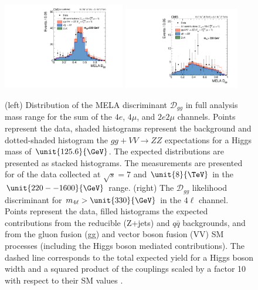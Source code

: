 \begin{figure}
\centering
\includegraphics[width=0.475\textwidth]{HZZ_Width/cCompare_DataMC_AllTeV_Dgg10__Low220.pdf}
\includegraphics[width=0.45\textwidth]{HZZ_Width/fig3b_new.pdf}
\caption[(left) Distribution of the MELA discriminant $\mathcal{D}_{gg}$ in full analysis mass range for the sum of the $4e$, $4\mu$, and $2e2\mu$ channels. Points represent the data, shaded histograms represent the background and dotted-shaded histogram the $gg+VV \to ZZ$ expectations for a Higgs mass of $\unit{125.6}{\GeV}$. The expected distributions are presented as stacked histograms. The measurements are presented for of the data collected at $\sqrt{s} = 7$ and $\unit{8}{\TeV}$ in the $\unit{220--1600}{\GeV}$ range. (right) The $\mathcal{D}_{gg}$ likelihood discriminant for $m_{4\ell} > \unit{330}{\GeV}$ in the $4\ell$ channel. Points represent the data, filled histograms the expected contributions from the reducible (Z+jets) and $q\bar{q}$ backgrounds, and from the gluon fusion (gg) and vector boson fusion (VV) SM processes (including the Higgs boson mediated contributions). The dashed line corresponds to the total expected yield for a Higgs boson width and a squared product of the couplings scaled by a factor 10 with respect to their SM values.]
{
(left) Distribution of the MELA discriminant $\mathcal{D}_{gg}$ in full analysis mass range for the sum of the $4e$, $4\mu$, and $2e2\mu$ channels. Points represent the data, shaded histograms represent the background and dotted-shaded histogram the $gg+VV \to ZZ$ expectations for a Higgs mass of $\unit{125.6}{\GeV}$. The expected distributions are presented as stacked histograms. The measurements are presented for of the data collected at $\sqrt{s} = 7$ and $\unit{8}{\TeV}$ in the $\unit{220--1600}{\GeV}$ range. (right) The $\mathcal{D}_{gg}$ likelihood discriminant for $m_{4\ell} > \unit{330}{\GeV}$ in the $4\ell$ channel. Points represent the data, filled histograms the expected contributions from the reducible (Z+jets) and $q\bar{q}$ backgrounds, and from the gluon fusion (gg) and vector boson fusion (VV) SM processes (including the Higgs boson mediated contributions). The dashed line corresponds to the total expected yield for a Higgs boson width and a squared product of the couplings scaled by a factor 10 with respect to their SM values \cite{Khachatryan:2014iha}.
}
\end{figure}
